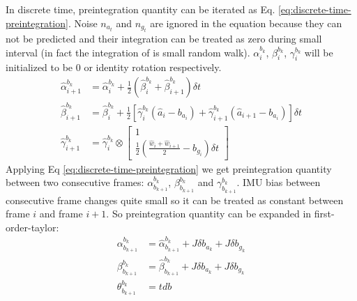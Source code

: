 In discrete time, preintegration quantity can be iterated as Eq. \ref{eq:discrete-time-preintegration}. Noise $n_{a_t}$ and $n_{g_t}$ are ignored in the equation because they can not be predicted and their integration can be treated as zero during small interval (in fact the integration of is small random walk). $\alpha_i^{b_k}$, $\beta_i^{b_k}$, $\gamma_i^{b_k}$ will be initialized to be 0 or identity rotation respectively.
\begin{equation} \label{eq:discrete-time-preintegration}
	\begin{split}
		\hat{\alpha}_{i+1}^{b_k} &= \hat{\alpha}_i^{b_k} + \frac12(\hat{\beta}_i^{b_k}+\hat{\beta}_{i+1}^{b_k})\delta{t} \\
		\hat{\beta}_{i+1}^{b_k} &= \hat{\beta}_i^{b_k} + \frac12\left[\hat{\gamma}_i^{b_k}(\hat{a}_i-b_{a_i})+\hat{\gamma}_{i+1}^{b_k}(\hat{a}_{i+1}-b_{a_i})\right]\delta{t} \\
		\hat{\gamma}_{i+1}^{b_k} &= \hat{\gamma}_i^{b_k} \otimes
		\begin{bmatrix}
			1 \\ \frac12(\frac{\hat{w}_i+\hat{w}_{i+1}}2-b_{g_i})\delta{t}
		\end{bmatrix}
	\end{split}
\end{equation}
Applying Eq \ref{eq:discrete-time-preintegration} we get preintegration quantity between two consecutive frames: $\alpha_{b_{k+1}}^{b_k}$, $\beta_{b_{k+1}}^{b_k}$ and $\gamma_{b_{k+1}}^{b_k}$. IMU bias between consecutive frame changes quite small so it can be treated as constant between frame $i$ and frame $i+1$.
So preintegration quantity can be expanded in first-order-taylor:
\begin{equation}
	\begin{split}
		\alpha_{b_{k+1}}^{b_k} &= \hat{\alpha}_{b_{k+1}}^{b_k}+J\delta{b_{a_k}}+J\delta{b_{g_k}} \\
		\beta_{b_{k+1}}^{b_k} &= \hat{\beta}_{b_{k+1}}^{b_k}+J\delta{b_{a_k}}+J\delta{b_{g_k}} \\
		\theta_{b_{k+1}}^{b_k} &= tdb
	\end{split}
\end{equation}
